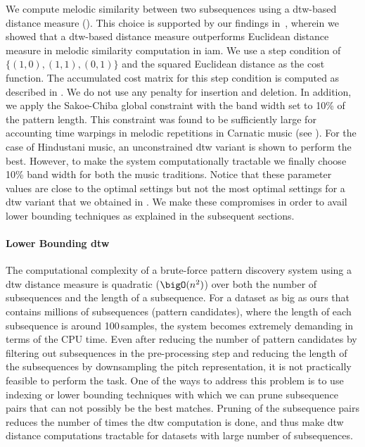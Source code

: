 We compute melodic similarity between two subsequences using a \gls{dtw}-based distance measure (). This choice is supported by our findings in~, wherein we showed that a \gls{dtw}-based distance measure outperforms Euclidean distance measure in melodic similarity computation in \gls{iam}. We use a step condition of $\lbrace(1,0), (1,1), (0,1)\rbrace$ and the squared Euclidean distance as the cost function. The accumulated cost matrix for this step condition is computed as described in . We do not use any penalty for insertion and deletion. In addition, we apply the Sakoe-Chiba global constraint with the band width set to 10\% of the pattern length. This constraint was found to be sufficiently large for accounting time warpings in melodic repetitions in Carnatic music (see ). For the case of Hindustani music, an unconstrained \gls{dtw} variant is shown to perform the best. However, to make the system computationally tractable we finally choose 10\% band width for both the music traditions. Notice that these parameter values are close to the optimal settings but not the most optimal settings for a \gls{dtw} variant that we obtained in . We make these compromises in order to avail lower bounding techniques as explained in the subsequent sections. 	

\paragraph{Lower Bounding \gls{dtw}}
\label{LowerBoundingDTW}

The computational complexity of a brute-force pattern discovery system using a \gls{dtw} distance measure is quadratic ($\bigO(n^2)$) over both the number of subsequences and the length of a subsequence. For a dataset as big as ours that contains millions of subsequences (pattern candidates), where the length of each subsequence is around 100\,samples, the system becomes extremely demanding in terms of the CPU time. Even after reducing the number of pattern candidates by filtering out subsequences in the pre-processing step and reducing the length of the subsequences by downsampling the pitch representation, it is not practically feasible to perform the task. One of the ways to address this problem is to use indexing or lower bounding techniques with which we can prune subsequence pairs that can not possibly be the best matches. Pruning of the subsequence pairs reduces the number of times the \gls{dtw} computation is done, and thus make \gls{dtw} distance computations tractable for datasets with large number of subsequences.

